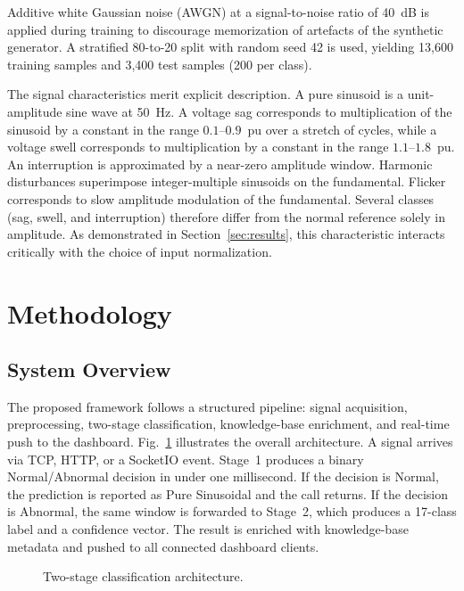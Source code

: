 \documentclass[conference]{IEEEtran}
\begin{document}
Additive white Gaussian noise (AWGN) at a signal-to-noise ratio of
40~dB is applied during training to discourage memorization of
artefacts of the synthetic generator. A stratified 80-to-20 split with
random seed 42 is used, yielding 13{,}600 training samples and
3{,}400 test samples (200 per class).

The signal characteristics merit explicit description. A pure sinusoid
is a unit-amplitude sine wave at 50~Hz. A voltage sag corresponds to
multiplication of the sinusoid by a constant in the range
$0.1$--$0.9$~pu over a stretch of cycles, while a voltage swell
corresponds to multiplication by a constant in the range
$1.1$--$1.8$~pu. An interruption is approximated by a near-zero
amplitude window. Harmonic disturbances superimpose integer-multiple
sinusoids on the fundamental. Flicker corresponds to slow amplitude
modulation of the fundamental. Several classes (sag, swell, and
interruption) therefore differ from the normal reference solely in
amplitude. As demonstrated in Section~\ref{sec:results}, this
characteristic interacts critically with the choice of input
normalization.

\section{Methodology}\label{sec:method}
\subsection{System Overview}
The proposed framework follows a structured pipeline: signal
acquisition, preprocessing, two-stage classification, knowledge-base
enrichment, and real-time push to the dashboard.
Fig.~\ref{fig:arch} illustrates the overall architecture. A signal
arrives via TCP, HTTP, or a SocketIO event. Stage~1 produces a binary
Normal/Abnormal decision in under one millisecond. If the decision is
Normal, the prediction is reported as Pure Sinusoidal and the call
returns. If the decision is Abnormal, the same window is forwarded to
Stage~2, which produces a 17-class label and a confidence vector. The
result is enriched with knowledge-base metadata and pushed to all
connected dashboard clients.

\begin{figure}[!htbp]
  \centering
  
  \caption{Two-stage classification architecture.}
  \label{fig:arch}
\end{figure}
\end{document}
